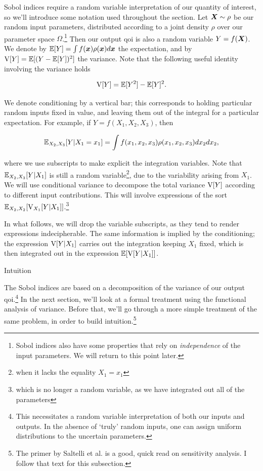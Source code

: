 \documentclass[../primer.tex]{subfiles}
\begin{document}
Sobol indices require a random variable interpretation of our quantity of
interest, so we'll introduce some notation used throughout the section. Let
\(\boldsymbol{X}\sim\rho\) be our random input parameters, distributed according to a joint
density \(\rho\) over our parameter space \(\Omega\).\footnote{Sobol indices also have
some properties that rely on \emph{independence} of the input parameters. We will
return to this point later.} Then our output qoi is also a random variable
\(Y=f(\boldsymbol{X})\). We denote by \(\mathbb{E}[Y] = \int f(\boldsymbol{x})\rho(\boldsymbol{x})d\boldsymbol{x}\) the expectation, and
by \(\mathrm{V}[Y]=\mathbb{E}[(Y-\mathbb{E}[Y])^2]\) the variance. Note that the following useful identity
involving the variance holds

\begin{equation}
  \mathrm{V}[Y] = \mathbb{E}[Y^2] - \mathbb{E}[Y]^2.
\end{equation}

We denote conditioning by a vertical bar; this corresponds to holding particular
random inputs fixed in value, and leaving them out of the integral for a
particular expectation. For example, if \(Y=f(X_1,X_2,X_3)\), then

\begin{equation}
  \mathbb{E}_{X_2,X_3}[Y|X_1=x_1] = \int f(x_1,x_2,x_3)\rho(x_1,x_2,x_3)dx_2dx_2,
\end{equation}

\noindent where we use subscripts to make explicit the integration variables.
Note that \(\mathbb{E}_{X_2,X_3}[Y|X_1]\) is still a random variable\footnote{when it lacks the
equality \(X_1=x_1\)}, due to the variability arising from \(X_1\). We will use
conditional variance to decompose the total variance \(\mathrm{V}[Y]\) according to
different input contributions. This will involve expressions of the sort
\(\mathbb{E}_{X_2,X_2}[\mathrm{V}_{X_1}[Y|X_1]]\).\footnote{which is no longer a random variable, as we
have integrated out all of the parameters}

In what follows, we will drop the variable subscripts, as they tend to render
expressions indecipherable. The same information is implied by the conditioning;
the expression \(\mathrm{V}[Y|X_1]\) carries out the integration keeping \(X_1\) fixed,
which is then integrated out in the expression \(\mathbb{E}[\mathrm{V}[Y|X_1]]\).

Intuition

The Sobol indices are based on a decomposition of the variance of our output
qoi.\footnote{This necessitates a random variable interpretation of both our inputs
and outputs. In the absence of `truly' random inputs, one can assign uniform
distributions to the uncertain parameters.} In the next section, we'll look at a
formal treatment using the functional analysis of variance. Before that, we'll
go through a more simple treatment of the same problem, in order to build
intuition.\footnote{The primer by Saltelli et al.\cite{saltelli2004sensitivity} is a
good, quick read on sensitivity analysis. I follow that text for this
subsection.}
\end{document}
